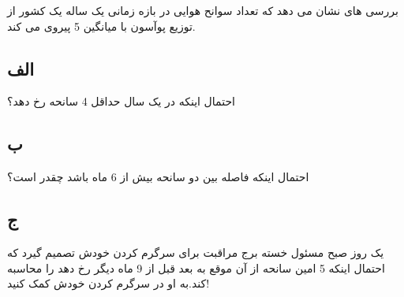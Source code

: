 
بررسی های نشان می دهد که تعداد سوانح هوایی در بازه زمانی یک ساله یک کشور از توزیع پوآسون با میانگین 5 پیروی می کند.
\subsection*{الف}
احتمال اینکه در یک سال حداقل 4 سانحه رخ دهد؟
\subsection*{ب}
احتمال اینکه فاصله بین دو سانحه بیش از 6 ماه باشد چقدر است؟
\subsection*{ج}
یک روز صبح مسئول خسته برج مراقبت برای سرگرم کردن خودش تصمیم گیرد که احتمال اینکه 5 امین سانحه از آن موقع به بعد قبل از 9 ماه دیگر رخ دهد را محاسبه کند.به او در سرگرم کردن خودش کمک کنید!

  
  
  


